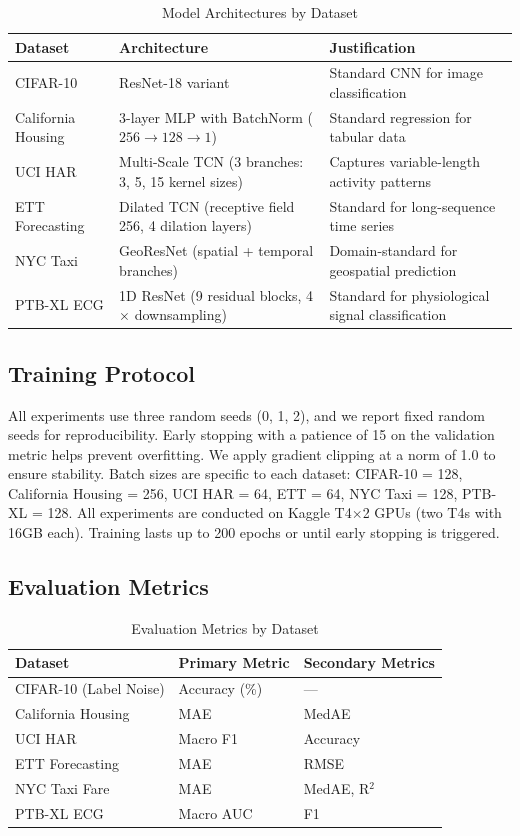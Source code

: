 \documentclass[11pt,a4paper]{article}
\begin{document}
\begin{table}[H]
\centering
\tiny
\caption{Model Architectures by Dataset}
\label{tab:architectures}
\begin{tabular}{lll}
\toprule
\textbf{Dataset} & \textbf{Architecture} & \textbf{Justification} \\
\midrule
CIFAR-10 & ResNet-18 variant \citep{he2016resnet} & Standard CNN for image classification \\
California Housing & 3-layer MLP with BatchNorm ($256 \rightarrow 128 \rightarrow 1$) & Standard regression for tabular data \\
UCI HAR & Multi-Scale TCN (3 branches: 3, 5, 15 kernel sizes) & Captures variable-length activity patterns \\
ETT Forecasting & Dilated TCN (receptive field 256, 4 dilation layers) & Standard for long-sequence time series \\
NYC Taxi & GeoResNet (spatial + temporal branches) & Domain-standard for geospatial prediction \\
PTB-XL ECG & 1D ResNet (9 residual blocks, 4$\times$ downsampling) & Standard for physiological signal classification \\
\bottomrule
\end{tabular}
\end{table}

\subsection{Training Protocol}

All experiments use three random seeds (0, 1, 2), and we report fixed random seeds for reproducibility. Early stopping with a patience of 15 on the validation metric helps prevent overfitting. We apply gradient clipping at a norm of 1.0 to ensure stability. Batch sizes are specific to each dataset: CIFAR-10 = 128, California Housing = 256, UCI HAR = 64, ETT = 64, NYC Taxi = 128, PTB-XL = 128. All experiments are conducted on Kaggle T4$\times$2 GPUs (two T4s with 16GB each). Training lasts up to 200 epochs or until early stopping is triggered.

\subsection{Evaluation Metrics}

\begin{table}[H]
\centering
\caption{Evaluation Metrics by Dataset}
\label{tab:metrics}
\begin{tabular}{lll}
\toprule
\textbf{Dataset} & \textbf{Primary Metric} & \textbf{Secondary Metrics} \\
\midrule
CIFAR-10 (Label Noise) & Accuracy (\%) & --- \\
California Housing & MAE & MedAE \\
UCI HAR & Macro F1 & Accuracy \\
ETT Forecasting & MAE & RMSE \\
NYC Taxi Fare & MAE & MedAE, R$^2$ \\
PTB-XL ECG & Macro AUC & F1 \\
\bottomrule
\end{tabular}
\end{table}
\end{document}
